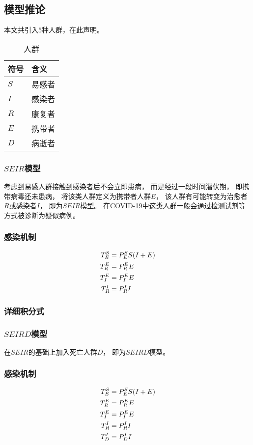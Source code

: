 \subsection{模型推论}
\par 本文共引入$5$种人群，在此声明。
\begin{table}[H]
    \centering
    \caption{人群}
    \begin{tabular}{ll}
        \hline
        符号 & 含义   \\
        \hline
        $S$  & 易感者 \\
        $I$  & 感染者 \\
        $R$  & 康复者 \\
        $E$  & 携带者 \\
        $D$  & 病逝者 \\
        \hline
    \end{tabular}
\end{table}
\subsubsection{$SEIR$模型}
\par 考虑到易感人群接触到感染者后不会立即患病，
而是经过一段时间潜伏期，
即携带病毒还未患病，
将该类人群定义为携带者人群$E$，
该人群有可能转变为治愈者$R$或感染者$I$，
即为$SEIR$模型。
在COVID-19中这类人群一般会通过检测试剂等方式被诊断为疑似病例。
\subsubsection{感染机制}
\begin{align}
    T^{S}_{E}&=P^{S}_{E}S(I+E) \\
    T^{E}_{R}&=P^{E}_{R}E      \\
    T^{E}_{I}&=P^{E}_{I}E      \\
    T^{I}_{R}&=P^{I}_{R}I
\end{align}
\subsubsection{详细积分式}
\SEIR
\subsubsection{$SEIRD$模型}
\par 在$SEIR$的基础上加入死亡人群$D$，
即为$SEIRD$模型。
\subsubsection{感染机制}
\begin{align}
    T^{S}_{E}&=P^{S}_{E}S(I+E) \\
    T^{E}_{R}&=P^{E}_{R}E      \\
    T^{E}_{I}&=P^{E}_{I}E      \\
    T^{I}_{R}&=P^{I}_{R}I      \\
    T^{I}_{D}&=P^{I}_{D}I
\end{align}
